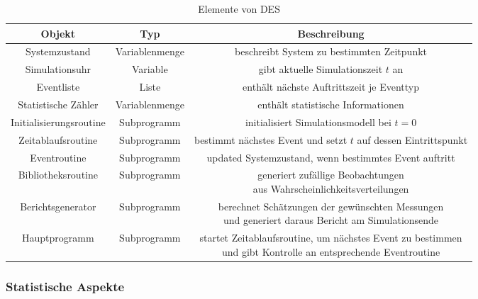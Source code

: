 \documentclass[nonacm=true, language=german]{acmart}
\begin{document}
\begin{table}[ht]
    \centering
    \begin{tabular}{c|c|c}
        \toprule
        Objekt                  & Typ               & Beschreibung \\
        \midrule
        Systemzustand           & Variablenmenge    & beschreibt System zu bestimmten Zeitpunkt \\
        Simulationsuhr          & Variable          & gibt aktuelle Simulationszeit $t$ an \\
        Eventliste              & Liste             & enthält nächste Auftrittszeit je Eventtyp \\
        Statistische Zähler     & Variablenmenge    & enthält statistische Informationen \\
        Initialisierungsroutine & Subprogramm       & initialisiert Simulationsmodell bei $t=0$ \\
        Zeitablaufsroutine      & Subprogramm       & bestimmt nächstes Event und setzt $t$ auf dessen Eintrittspunkt \\
        Eventroutine            & Subprogramm       & updated Systemzustand, wenn bestimmtes Event auftritt \\
        Bibliotheksroutine      & Subprogramm       & \makecell{generiert zufällige Beobachtungen \\ aus Wahrscheinlichkeitsverteilungen} \\
        Berichtsgenerator       & Subprogramm       & \makecell{berechnet Schätzungen der gewünschten Messungen \\ und generiert daraus Bericht am Simulationsende} \\
        Hauptprogramm           & Subprogramm       & \makecell{startet Zeitablaufsroutine, um nächstes Event zu bestimmen \\ und gibt Kontrolle an entsprechende Eventroutine} \\
        \bottomrule
    \end{tabular}
    \caption{Elemente von \ac{DES}}
    \label{tab:elements_des}
\end{table}

\newpage

\subsubsection{Statistische Aspekte}
\end{document}
